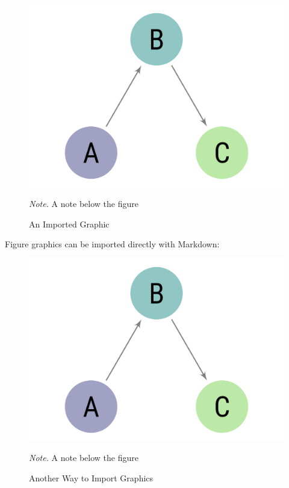 \documentclass[
  jou,
  longtable,
  colorlinks=true,linkcolor=blue,citecolor=blue,urlcolor=blue]{apa7}
\begin{document}
\begin{figure}[!htbp]

{\caption{{An Imported Graphic}{\label{fig-import1}}}}

\includegraphics[width=1\textwidth,height=\textheight]{img/sampleimage.png}

{\noindent \emph{Note.} A note below the figure}

\end{figure}

Figure graphics can be imported directly with Markdown:

\begin{figure}[!htbp]

{\caption{{Another Way to Import Graphics}{\label{fig-import2}}}}

\includegraphics{img/sampleimage.png}

{\noindent \emph{Note.} A note below the figure}

\end{figure}
\end{document}
